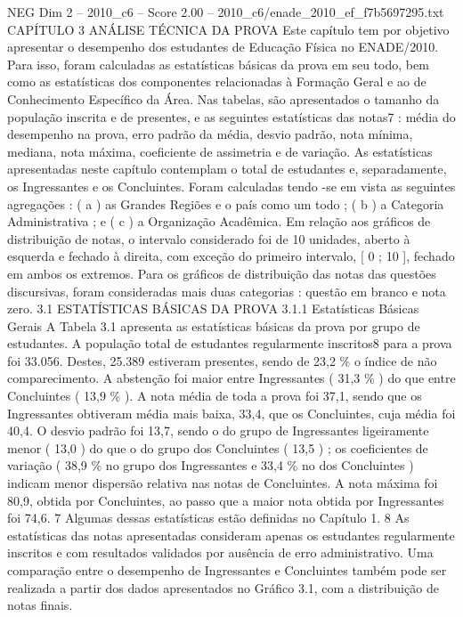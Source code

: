 \begin{textsample}{NEG Dim 2 – 2010\_c6 – Score 2.00 – 2010\_c6/enade\_2010\_ef\_f7b5697295.txt}  \label{ex:f2_neg_254}
CAPÍTULO 3 ANÁLISE TÉCNICA DA PROVA Este capítulo tem por objetivo apresentar o desempenho dos estudantes de Educação Física no ENADE/2010.
Para isso, foram calculadas as estatísticas básicas da prova em seu todo, bem como as estatísticas dos componentes relacionadas à Formação Geral e ao de Conhecimento Específico da Área.
Nas tabelas, são apresentados o tamanho da população inscrita e de presentes, e as seguintes estatísticas das notas7 : média do desempenho na prova, erro padrão da média, desvio padrão, nota mínima, mediana, nota máxima, coeficiente de assimetria e de variação.
As estatísticas apresentadas neste capítulo contemplam o total de estudantes e, separadamente, os Ingressantes e os Concluintes.
Foram calculadas tendo -se em vista as seguintes agregações : ( a ) as Grandes Regiões e o país como um todo ; ( b ) a Categoria Administrativa ; e ( c ) a Organização Acadêmica.
Em relação aos gráficos de distribuição de notas, o intervalo considerado foi de 10 unidades, aberto à esquerda e fechado à direita, com exceção do primeiro intervalo, [ 0 ; 10 ], fechado em ambos os extremos.
Para os gráficos de distribuição das notas das questões discursivas, foram consideradas mais duas categorias : questão em branco e nota zero. 3.1 ESTATÍSTICAS BÁSICAS DA PROVA 3.1.1 Estatísticas Básicas Gerais A Tabela 3.1 apresenta as estatísticas básicas da prova por grupo de estudantes.
A população total de estudantes regularmente inscritos8 para a prova foi 33.056.
Destes, 25.389 estiveram presentes, sendo de 23,2 \% o índice de não comparecimento.
A abstenção foi maior entre Ingressantes ( 31,3 \% ) do que entre Concluintes ( 13,9 \% ).
A nota média de toda a prova foi 37,1, sendo que os Ingressantes obtiveram média mais baixa, 33,4, que os Concluintes, cuja média foi 40,4.
O desvio padrão foi 13,7, sendo o do grupo de Ingressantes ligeiramente menor ( 13,0 ) do que o do grupo dos Concluintes ( 13,5 ) ; os coeficientes de variação ( 38,9 \% no grupo dos Ingressantes e 33,4 \% no dos Concluintes ) indicam menor dispersão relativa nas notas de Concluintes.
A nota máxima foi 80,9, obtida por Concluintes, ao passo que a maior nota obtida por Ingressantes foi 74,6. 7 Algumas dessas estatísticas estão definidas no Capítulo 1. 8 As estatísticas das notas apresentadas consideram apenas os estudantes regularmente inscritos e com resultados validados por ausência de erro administrativo.
Uma comparação entre o desempenho de Ingressantes e Concluintes também pode ser realizada a partir dos dados apresentados no Gráfico 3.1, com a distribuição de notas finais.

\end{textsample}
